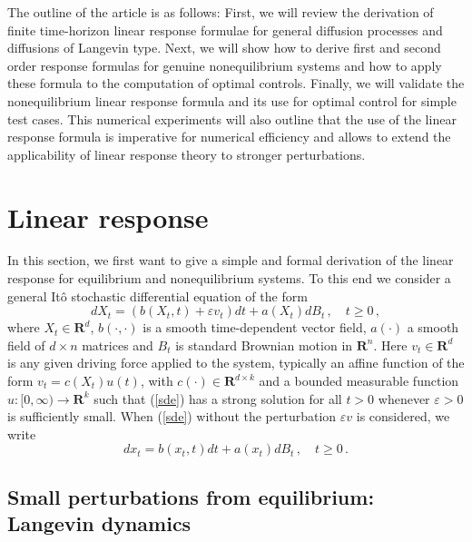 \documentclass[]{tMPH2e}
\newcommand{\R}{{\mathbf R}}
\newcommand{\eps}{\varepsilon}
\begin{document}
The outline of the article is as follows: First, we will review the derivation of finite time-horizon linear response formulae for general diffusion processes and diffusions of Langevin type. Next, we will show how to derive first and second order response formulas for genuine nonequilibrium systems and how to apply these formula to the computation of optimal controls. Finally, we will validate the nonequilibrium linear response formula and its use for optimal control for simple test cases. This numerical experiments will also outline that the use of the linear response formula is imperative for numerical efficiency and allows to extend the applicability of linear response theory to stronger perturbations. 


 

\section{Linear response}


In this section, we first want to give a simple and formal derivation of the linear response for equilibrium and nonequilibrium systems. To this end we consider a general It\^o stochastic differential equation of the form
\begin{equation}\label{sde}
dX_{t} = (b(X_{t},t) + \eps v_{t})dt +a(X_{t})dB_{t}\,,\quad t\ge 0\,,
\end{equation}
where $X_{t}\in\R^{d}$, $b(\cdot,\cdot)$ is a smooth time-dependent vector field, $a(\cdot)$ a smooth field of $d\times n$ matrices and $B_{t}$ is standard Brownian motion in $\R^{n}$. Here $v_{t}\in\R^{d}$ is any given driving force applied to the system, typically an affine function of the form $v_{t}=c(X_{t})u(t)$, with $c(\cdot)\in\R^{d\times k}$ and a bounded measurable function $u\colon[0,\infty)\to\R^{k}$ such that (\ref{sde}) has a strong solution for all $t> 0$ whenever $\eps>0$ is sufficiently small. When (\ref{sde}) without the perturbation $\eps v$ is considered, we write
\begin{equation}\label{sdewo}
dx_{t} = b(x_{t},t)dt +a(x_{t})dB_{t}\,,\quad t\ge 0\,. 
\end{equation}


  




\subsection{Small perturbations from equilibrium: Langevin dynamics}\label{ssec:equiLRT}
\end{document}
